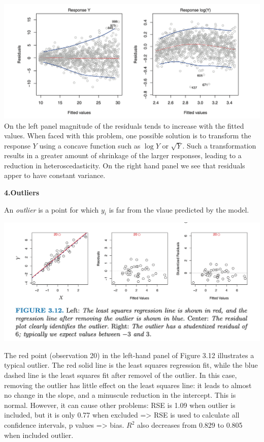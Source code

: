 \documentclass[
  letterpaper,
  DIV=11,
  numbers=noendperiod]{scrreprt}
\begin{document}
\includegraphics{fig3.11.png} On the left panel magnitude of the
residuals tends to increase with the fitted values. When faced with this
problem, one possible solution is to transform the response \(Y\) using
a concave function such as \(\log Y\) or \(\sqrt{Y}\). Such a
transformation results in a greater amount of shrinkage of the larger
responses, leading to a reduction in heteroscedasticity. On the right
hand panel we see that residuals apper to have constant variance.

\textbf{4.Outliers}

An \emph{outlier} is a point for which \(y_i\) is far from the vlaue
predicted by the model.

\includegraphics{fig3.12.png}

The red point (observation 20) in the left-hand panel of Figure 3.12
illustrates a typical outlier. The red solid line is the least squares
regression fit, while the blue dashed line is the least squares fit
after removel of the outlier. In this case, removing the outlier has
little effect on the least squares line: it leads to almost no change in
the slope, and a minuscule reduction in the intercept. This is normal.
However, it can cause other problems: RSE is 1.09 when outlier is
included, but it is only 0.77 when excluded =\textgreater{} RSE is used
to calculate all confidence intervals, p values =\textgreater{} bias.
\(R^2\) also decreases from 0.829 to 0.805 when included outlier.
\end{document}

